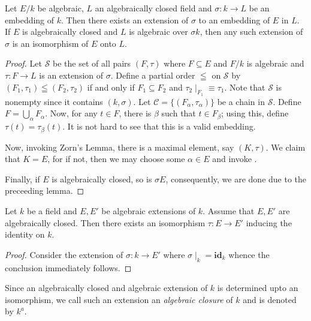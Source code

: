 \begin{theorem}
    Let $E/k$ be algebraic, $L$ an algebraically closed field and $\sigma: k\to L$ be an embedding of $k$. Then there exists an extension of $\sigma$ to an embedding of $E$ in $L$. If $E$ is algebraically closed and $L$ is algebraic over $\sigma k$, then any such extension of $\sigma$ is an isomorphism of $E$ onto $L$.
\end{theorem}
\begin{proof}
    Let $\mathscr S$ be the set of all pairs $(F,\tau)$ where $F\subseteq E$ and $F/k$ is algebraic and $\tau: F\to L$ is an extension of $\sigma$. Define a partial order $\leqq$ on $\mathscr S$ by $(F_1,\tau_1)\leqq(F_2,\tau_2)$ if and only if $F_1\subseteq F_2$ and $\tau_2\mid_{F_1}\equiv\tau_1$. Note that $\mathscr S$ is nonempty since it contains $(k,\sigma)$. Let $\mathscr C = \{(F_\alpha,\tau_\alpha)\}$ be a chain in $\mathscr S$. Define $F = \bigcup_{\alpha} F_\alpha$. Now, for any $t\in F$, there is $\beta$ such that $t\in F_\beta$; using this, define $\tau(t) = \tau_\beta(t)$. It is not hard to see that this is a valid embedding.

    Now, invoking Zorn's Lemma, there is a maximal element, say $(K,\tau)$. We claim that $K = E$, for if not, then we may choose some $\alpha\in E$ and invoke .

    Finally, if $E$ is algebraically closed, so is $\sigma E$, consequently, we are done due to the preceeding lemma.
\end{proof}

\begin{corollary}
    Let $k$ be a field and $E, E'$ be algebraic extensions of $k$. Assume that $E, E'$ are algebraically closed. Then there exists an isomorphism $\tau: E\to E'$ inducing the identity on $k$.
\end{corollary}
\begin{proof}
    Consider the extension of $\sigma: k\to E'$ where $\sigma\mid_k = \mathbf{id}_k$ whence the conclusion immediately follows.
\end{proof}

Since an algebraically closed and algebraic extension of $k$ is determined upto an isomorphism, we call such an extension an \textit{algebraic closure} of $k$ and is denoted by $k^a$.